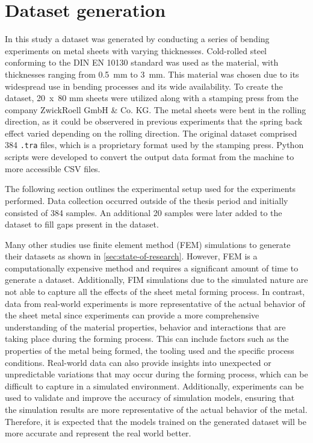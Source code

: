 \section{Dataset generation}\label{sec:dataset-generation}
In this study a dataset was generated by conducting a series of bending experiments on metal sheets with varying
thicknesses.
Cold-rolled steel conforming to the DIN EN 10130 standard was used as the material, with thicknesses ranging from
0.5~mm to 3~mm.
This material was chosen due to its widespread use in bending processes and its wide availability.
To create the dataset, 20~x~80 mm sheets were utilized along with a stamping press from the company ZwickRoell GmbH
\& Co. KG.
The metal sheets were bent in the rolling direction, as it could be observered in previous experiments that the spring
back effect varied depending on the rolling direction.
The original dataset comprised 384 \texttt{.tra} files, which is a proprietary format used by the stamping press.
Python scripts were developed to convert the output data format from the machine to more accessible CSV files.

The following section outlines the experimental setup used for the experiments performed.
Data collection occurred outside of the thesis period and initially consisted of 384 samples.
An additional 20 samples were later added to the dataset to fill gaps present in the dataset.

Many other studies use finite element method (FEM) simulations to generate their datasets as shown in
\cref{sec:state-of-research}.
However, FEM is a computationally expensive method and requires a significant amount of time to
generate a dataset.
Additionally, FIM simulations due to the simulated nature are not able to capture all the effects of the sheet metal
forming process.
In contrast, data from real-world experiments is more representative of the actual behavior of the sheet metal since
experiments can provide a more comprehensive understanding of the material properties, behavior and interactions
that are taking place during the forming process.
This can include factors such as the properties of the metal being formed, the tooling used and the specific process
conditions.
Real-world data can also provide insights into unexpected or unpredictable variations that may occur during the
forming process, which can be difficult to capture in a simulated environment.
Additionally, experiments can be used to validate and improve the accuracy of simulation models, ensuring that the
simulation results are more representative of the actual behavior of the metal.
Therefore, it is expected that the models trained on the generated dataset will be more accurate and represent the real
world better.

